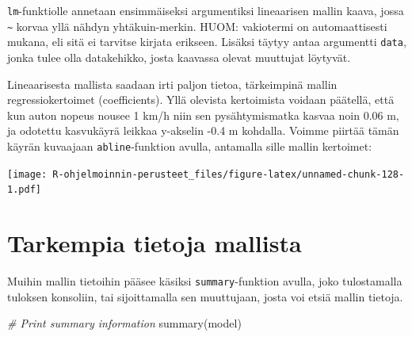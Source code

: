 \documentclass[
]{book}
\newenvironment{Shaded}{\begin{snugshade}}{\end{snugshade}}
\newcommand{\AttributeTok}[1]{\textcolor[rgb]{0.77,0.63,0.00}{#1}}
\newcommand{\CommentTok}[1]{\textcolor[rgb]{0.56,0.35,0.01}{\textit{#1}}}
\newcommand{\DecValTok}[1]{\textcolor[rgb]{0.00,0.00,0.81}{#1}}
\newcommand{\FunctionTok}[1]{\textcolor[rgb]{0.00,0.00,0.00}{#1}}
\newcommand{\NormalTok}[1]{#1}
\newcommand{\SpecialCharTok}[1]{\textcolor[rgb]{0.00,0.00,0.00}{#1}}
\newcommand{\StringTok}[1]{\textcolor[rgb]{0.31,0.60,0.02}{#1}}
\begin{document}
\texttt{lm}-funktiolle annetaan ensimmäiseksi argumentiksi lineaarisen mallin kaava, jossa \texttt{\textasciitilde{}} korvaa yllä nähdyn yhtäkuin-merkin. HUOM: vakiotermi on automaattisesti mukana, eli sitä ei tarvitse kirjata erikseen. Lisäksi täytyy antaa argumentti \texttt{data}, jonka tulee olla datakehikko, josta kaavassa olevat muuttujat löytyvät.

Lineaarisesta mallista saadaan irti paljon tietoa, tärkeimpinä mallin regressiokertoimet (coefficients). Yllä olevista kertoimista voidaan päätellä, että kun auton nopeus nousee 1 km/h niin sen pysähtymismatka kasvaa noin 0.06 m, ja odotettu kasvukäyrä leikkaa y-akselin -0.4 m kohdalla. Voimme piirtää tämän käyrän kuvaajaan \texttt{abline}-funktion avulla, antamalla sille mallin kertoimet:

\begin{Shaded}
\end{Shaded}

\texttt{[image: R-ohjelmoinnin-perusteet\_files/figure-latex/unnamed-chunk-128-1.pdf]}

\hypertarget{tarkempia-tietoja-mallista}{%
\section{Tarkempia tietoja mallista}\label{tarkempia-tietoja-mallista}}

Muihin mallin tietoihin pääsee käsiksi \texttt{summary}-funktion avulla, joko tulostamalla tuloksen konsoliin, tai sijoittamalla sen muuttujaan, josta voi etsiä mallin tietoja.

\begin{Shaded}
\begin{Highlighting}[]
\CommentTok{\# Print summary information}
\FunctionTok{summary}\NormalTok{(model)}
\end{Highlighting}
\end{Shaded}
\end{document}
